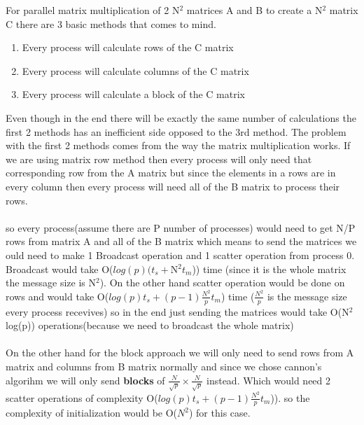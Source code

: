 For parallel matrix multiplication of 2 N$^2$ matrices A and B to create a N$^2$ matrix C there are 3 basic methods that comes to mind.
\begin{enumerate}
	\item Every process will calculate rows of the C matrix
	\item Every process will calculate columns of the C matrix
	\item Every process will calculate a block of the C matrix
\end{enumerate}
Even though in the end there will be exactly the same number of calculations the first 2 methods has an inefficient side opposed to the 3rd method. The problem with the first 2 methods comes from the way the matrix multiplication works. If we are using matrix row method then every process will only need that corresponding row from the A matrix but since the elements in a rows are in every column then every process will need all of the B matrix to process their rows. \\
\\
so every process(assume there are P number of processes) would need to get N/P rows from matrix A and all of the B matrix which means to send the matrices we ould need to make 1 Broadcast operation and 1 scatter operation from process 0. Broadcast would take O($log(p)(t_s+$N$^2t_m$)) time (since it is the whole matrix the message size is N$^2$). On the other hand scatter operation would be done on rows and would take O(\(log(p)t_s+(p-1)\frac{N^2}{p}t_m\)) time ($\frac{N^2}{p}$ is the message size every process recevives) so in the end just sending the matrices would take O(N$^2$log(p)) operations(because we need to broadcast the whole matrix)\\
\\
On the other hand for the block approach we will only need to send rows from A matrix and columns from B matrix normally and since we chose cannon's algorihm we will only send \textbf{blocks} of $\frac{N}{\sqrt{p}}\times \frac{N}{\sqrt{p}}$ instead. Which would need 2 scatter operations of complexity O(\(log(p)t_s+(p-1)\frac{N^2}{p}t_m\))).
so the complexity of initialization would be O(\(N^2\)) for this case.\\
\\
